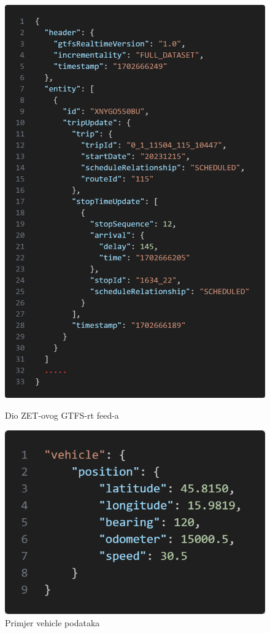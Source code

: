 \documentclass[zavrsnirad]{fer}
\begin{document}
\begin{figure}[htb]
	\centering
	\begin{minipage}[htb]{0.48\linewidth}
		\centering
		\includegraphics[width=\linewidth]{Figures/reply.png} 
		\caption{Dio ZET-ovog GTFS-rt feed-a}
		\label{slk:reply1}
	\end{minipage}
	\hfill
	\begin{minipage}[htb]{0.48\linewidth}
		\centering
		\includegraphics[width=\linewidth]{Figures/reply2.png} 
		\caption{Primjer vehicle podataka}
		\label{slk:reply2}
	\end{minipage}
\end{figure}
\end{document}
